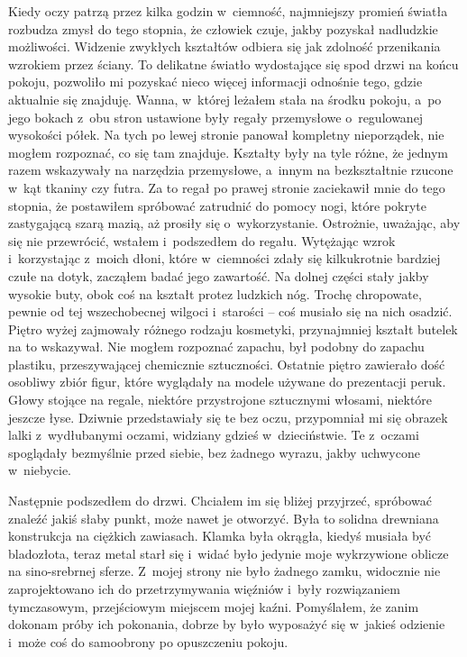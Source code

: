 Kiedy oczy patrzą przez kilka godzin w~ciemność, najmniejszy promień światła rozbudza zmysł do tego stopnia, że człowiek czuje, jakby pozyskał nadludzkie możliwości. Widzenie zwykłych kształtów odbiera się jak zdolność przenikania wzrokiem przez ściany. To delikatne światło wydostające się spod drzwi na końcu pokoju, pozwoliło mi pozyskać nieco więcej informacji odnośnie tego, gdzie aktualnie się znajduję. Wanna, w~której leżałem stała na środku pokoju, a~po jego bokach z~obu stron ustawione były regały przemysłowe o~regulowanej wysokości półek. Na tych po lewej stronie panował kompletny nieporządek, nie mogłem rozpoznać, co się tam znajduje. Kształty były na tyle różne, że jednym razem wskazywały na narzędzia przemysłowe, a~innym na bezkształtnie rzucone w~kąt tkaniny czy futra. Za to regał po prawej stronie zaciekawił mnie do tego stopnia, że postawiłem spróbować zatrudnić do pomocy nogi, które pokryte zastygającą szarą mazią, aż prosiły się o~wykorzystanie. Ostrożnie, uważając, aby się nie przewrócić, wstałem i~podszedłem do regału. Wytężając wzrok i~korzystając z~moich dłoni, które w~ciemności zdały się kilkukrotnie bardziej czułe na dotyk, zacząłem badać jego zawartość. Na dolnej części stały jakby wysokie buty, obok coś na kształt protez ludzkich nóg. Trochę chropowate, pewnie od tej wszechobecnej wilgoci i~starości -- coś musiało się na nich osadzić. Piętro wyżej zajmowały różnego rodzaju kosmetyki, przynajmniej kształt butelek na to wskazywał. Nie mogłem rozpoznać zapachu, był podobny do zapachu plastiku, przeszywającej chemicznie sztuczności. Ostatnie piętro zawierało dość osobliwy zbiór figur, które wyglądały na modele używane do prezentacji peruk. Głowy stojące na regale, niektóre przystrojone sztucznymi włosami, niektóre jeszcze łyse. Dziwnie przedstawiały się te bez oczu, przypomniał mi się obrazek lalki z~wydłubanymi oczami, widziany gdzieś w~dzieciństwie. Te z~oczami spoglądały bezmyślnie przed siebie, bez żadnego wyrazu, jakby uchwycone w~niebycie. 

Następnie podszedłem do drzwi. Chciałem im się bliżej przyjrzeć, spróbować znaleźć jakiś słaby punkt, może nawet je otworzyć. Była to solidna drewniana konstrukcja na ciężkich zawiasach. Klamka była okrągła, kiedyś musiała być bladozłota, teraz metal starł się i~widać było jedynie moje wykrzywione oblicze na sino-srebrnej sferze. Z~mojej strony nie było żadnego zamku, widocznie nie zaprojektowano ich do przetrzymywania więźniów i~były rozwiązaniem tymczasowym, przejściowym miejscem mojej kaźni. Pomyślałem, że zanim dokonam próby ich pokonania, dobrze by było wyposażyć się w~jakieś odzienie i~może coś do samoobrony po opuszczeniu pokoju.

